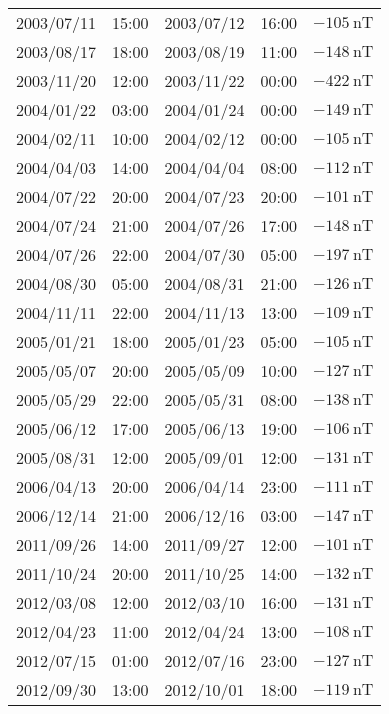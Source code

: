 \begin{table}[h]
\begin{tabular}{ccccc}
	2003/07/11 & 15:00 & 2003/07/12 & 16:00 & $ \SI{-105}{\nano\tesla}$ \\
	2003/08/17 & 18:00 & 2003/08/19 & 11:00 & $ \SI{-148}{\nano\tesla}$ \\
	2003/11/20 & 12:00 & 2003/11/22 & 00:00 & $ \SI{-422}{\nano\tesla}$ \\
	2004/01/22 & 03:00 & 2004/01/24 & 00:00 & $ \SI{-149}{\nano\tesla}$ \\
	2004/02/11 & 10:00 & 2004/02/12 & 00:00 & $ \SI{-105}{\nano\tesla}$ \\
	2004/04/03 & 14:00 & 2004/04/04 & 08:00 & $ \SI{-112}{\nano\tesla}$ \\
	2004/07/22 & 20:00 & 2004/07/23 & 20:00 & $ \SI{-101}{\nano\tesla}$ \\
	2004/07/24 & 21:00 & 2004/07/26 & 17:00 & $ \SI{-148}{\nano\tesla}$ \\
	2004/07/26 & 22:00 & 2004/07/30 & 05:00 & $ \SI{-197}{\nano\tesla}$ \\
	2004/08/30 & 05:00 & 2004/08/31 & 21:00 & $ \SI{-126}{\nano\tesla}$ \\
	2004/11/11 & 22:00 & 2004/11/13 & 13:00 & $ \SI{-109}{\nano\tesla}$ \\
	2005/01/21 & 18:00 & 2005/01/23 & 05:00 & $ \SI{-105}{\nano\tesla}$ \\
	2005/05/07 & 20:00 & 2005/05/09 & 10:00 & $ \SI{-127}{\nano\tesla}$ \\
	2005/05/29 & 22:00 & 2005/05/31 & 08:00 & $ \SI{-138}{\nano\tesla}$ \\
	2005/06/12 & 17:00 & 2005/06/13 & 19:00 & $ \SI{-106}{\nano\tesla}$ \\
	2005/08/31 & 12:00 & 2005/09/01 & 12:00 & $ \SI{-131}{\nano\tesla}$ \\
	2006/04/13 & 20:00 & 2006/04/14 & 23:00 & $ \SI{-111}{\nano\tesla}$ \\
	2006/12/14 & 21:00 & 2006/12/16 & 03:00 & $ \SI{-147}{\nano\tesla}$ \\ 
	2011/09/26 & 14:00 & 2011/09/27 & 12:00 & $ \SI{-101}{\nano\tesla}$ \\
	2011/10/24 & 20:00 & 2011/10/25 & 14:00 & $ \SI{-132}{\nano\tesla}$ \\
	2012/03/08 & 12:00 & 2012/03/10 & 16:00 & $ \SI{-131}{\nano\tesla}$ \\
	2012/04/23 & 11:00 & 2012/04/24 & 13:00 & $ \SI{-108}{\nano\tesla}$ \\
	2012/07/15 & 01:00 & 2012/07/16 & 23:00 & $ \SI{-127}{\nano\tesla}$ \\
	2012/09/30 & 13:00 & 2012/10/01 & 18:00 & $ \SI{-119}{\nano\tesla}$ \\

\end{tabular}
\end{table}
